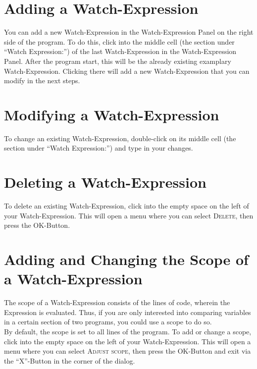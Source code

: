 \documentclass[parskip=full]{memoir}
\begin{document}
\section{Adding a Watch-Expression}\label{adding}
You can add a new Watch-Expression in the Watch-Expression Panel on the right side of the program. To do this, click into the middle cell (the section under \enquote{Watch Expression:}) of the last Watch-Expression in the Watch-Expression Panel. After the program start, this will be the already existing examplary Watch-Expression. Clicking there will add a new Watch-Expression that you can modify in the next steps.

\section{Modifying a Watch-Expression}\label{modifying}
To change an existing Watch-Expression, double-click on its middle cell (the section under \enquote{Watch Expression:}) and type in your changes.

\section{Deleting a Watch-Expression}\label{deleting}
To delete an existing Watch-Expression, click into the empty space on the left of your Watch-Expression. This will open a menu where you can select \textsc{Delete}, then press the \textsc{OK}-Button.

\section{Adding and Changing the Scope of a Watch-Expression}\label{scope}
The scope of a Watch-Expression consists of the lines of code, wherein the Expression is evaluated. Thus, if you are only interested into comparing variables in a certain section of two programs, you could use a scope to do so. \\
By default, the scope is set to all lines of the program.
To add or change a scope, click into the empty space on the left of your Watch-Expression. This will open a menu where you can select \textsc{Adjust scope}, then press the \textsc{OK}-Button and exit via the \enquote{X}-Button in the corner of the dialog.
\end{document}
